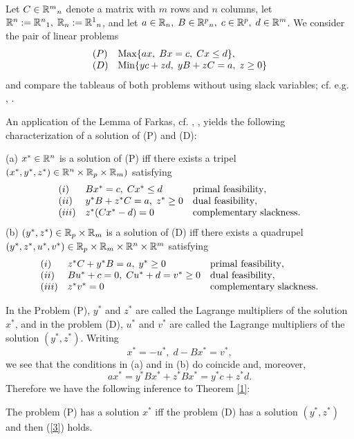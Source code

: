 Let $C \in \Bbb{R}^m{}_n$ denote a matrix with $m$ rows and $n$ columns, let
$\Bbb{R}^n := \Bbb{R}^n{}_1, \; \Bbb{R}_n := \Bbb{R}^1{}_n$, and let $a \in
\Bbb{R}_n, \; B \in \Bbb{R}^p{}_n, \; c \in \Bbb{R}^p, \; d \in \Bbb{R}^m$.
We consider the pair of linear problems
\[
\ba{.}{ll}
 (P) & \Max\{a x, \; Bx = c, \; Cx \leq d \},\\
 (D) & \Min\{yc + zd, \; yB + zC = a, \; z \geq 0\}
\ea{.}
\]
and compare the tableaus of both problems without using slack variables;
cf. e.g. \cite{BeRi}, \cite{GroTer}.
\par
An application of the Lemma of {\sc Farkas}, cf. \cite{Spe}, \cite{BeRi},
yields the following characterization of a solution of (P) and (D):

\begin{theorem} \label{1} (a)
$x^{\ast} \in \Bbb{R}^n$ is a solution of (P) iff there exists a tripel
$(x^*,y^*,z^*) \in \Bbb{R}^n \times \Bbb{R}_p \times \Bbb{R}_m)$ satisfying
%
\[
\ba{.}{lll}
(i) & Bx^{\ast} = c, \; Cx^* \leq d	& \mbox{primal feasibility},\\
(ii) & y^*B + z^*C = a, \; z^* \geq 0	& \mbox{dual feasibility},\\
(iii) & z^*(Cx^* - d) = 0		& \mbox{complementary slackness}.
\ea{.}
\]
(b) $(y^*,z^*) \in \Bbb{R}_p \times \Bbb{R}_m$ is a solution of (D) iff there
exists a quadrupel $(y^*,z^*,u^*,v^*) \in \Bbb{R}_p \times \Bbb{R}_m \times
\Bbb{R}^n \times \Bbb{R}^m$ satisfying
\[
\ba{.}{lll}
(i)   & z^*C + y^*B = a, \; y^* \geq 0	& \mbox{primal feasibility},\\
(ii)  & B u^* + c = 0, \; Cu^* + d = v^* \geq 0 & \mbox{dual
feasibility},\\
(iii) & z^*v^* = 0			& \mbox{complementary slackness}.
\ea{.}
\]
\end{theorem}
%
In the Problem (P), $y^*$ and $z^*$ are called the {\sc Lagrange} multipliers
of the solution $x^*$, and in the problem (D), $u^*$ and $v^*$ are called the
{\sc Lagrange} multipliers of the solution $(y^*, z^*)$.
Writing
\begin{equation} \label{2}
x^* = - u^*, \; d - Bx^* = v^*,
\end{equation}
we see that the conditions in (a) and in (b) do coincide and, moreover,
\begin{equation} \label{3}
ax^* = y^*Bx^* + z^*Bx^* = y^*c + z^*d.
\end{equation}
Therefore we have the following inference to Theorem \ref{1}:
%
\begin{theorem} \label{4}
The problem (P) has a solution $x^*$ iff the problem (D) has a solution
$(y^*,z^*)$ and then (\ref{3}) holds.
\end{theorem}
